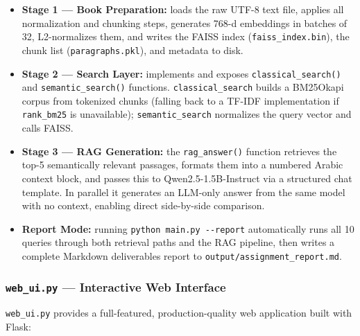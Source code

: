\begin{itemize}
  \item \textbf{Stage 1 --- Book Preparation:} loads the raw UTF-8
        text file, applies all normalization and chunking steps,
        generates 768-d embeddings in batches of 32, L2-normalizes
        them, and writes the FAISS index (\texttt{faiss\_index.bin}),
        the chunk list (\texttt{paragraphs.pkl}), and metadata to disk.

  \item \textbf{Stage 2 --- Search Layer:} implements and exposes
        \texttt{classical\_search()} and \texttt{semantic\_search()}
        functions.  \texttt{classical\_search} builds a BM25Okapi
        corpus from tokenized chunks (falling back to a TF-IDF
        implementation if \texttt{rank\_bm25} is unavailable);
        \texttt{semantic\_search} normalizes the query vector and
        calls FAISS.

  \item \textbf{Stage 3 --- RAG Generation:} the \texttt{rag\_answer()}
        function retrieves the top-5 semantically relevant passages,
        formats them into a numbered Arabic context block, and passes
        this to Qwen2.5-1.5B-Instruct via a structured chat template.
        In parallel it generates an LLM-only answer from the same
        model with no context, enabling direct side-by-side comparison.

  \item \textbf{Report Mode:} running \texttt{python main.py -{}-report}
        automatically runs all 10 queries through both retrieval paths and
        the RAG pipeline, then writes a complete Markdown deliverables
        report to \texttt{output/assignment\_report.md}.
\end{itemize}

\subsubsection{\texttt{web\_ui.py} --- Interactive Web Interface}

\texttt{web\_ui.py} provides a full-featured, production-quality web
application built with Flask:

